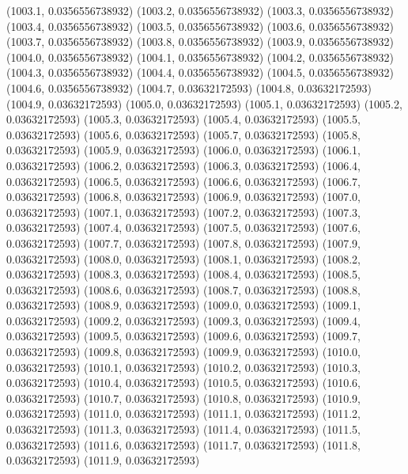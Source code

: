 {					(1003.1, 0.0356556738932)
					(1003.2, 0.0356556738932)
					(1003.3, 0.0356556738932)
					(1003.4, 0.0356556738932)
					(1003.5, 0.0356556738932)
					(1003.6, 0.0356556738932)
					(1003.7, 0.0356556738932)
					(1003.8, 0.0356556738932)
					(1003.9, 0.0356556738932)
					(1004.0, 0.0356556738932)
					(1004.1, 0.0356556738932)
					(1004.2, 0.0356556738932)
					(1004.3, 0.0356556738932)
					(1004.4, 0.0356556738932)
					(1004.5, 0.0356556738932)
					(1004.6, 0.0356556738932)
					(1004.7, 0.03632172593)
					(1004.8, 0.03632172593)
					(1004.9, 0.03632172593)
					(1005.0, 0.03632172593)
					(1005.1, 0.03632172593)
					(1005.2, 0.03632172593)
					(1005.3, 0.03632172593)
					(1005.4, 0.03632172593)
					(1005.5, 0.03632172593)
					(1005.6, 0.03632172593)
					(1005.7, 0.03632172593)
					(1005.8, 0.03632172593)
					(1005.9, 0.03632172593)
					(1006.0, 0.03632172593)
					(1006.1, 0.03632172593)
					(1006.2, 0.03632172593)
					(1006.3, 0.03632172593)
					(1006.4, 0.03632172593)
					(1006.5, 0.03632172593)
					(1006.6, 0.03632172593)
					(1006.7, 0.03632172593)
					(1006.8, 0.03632172593)
					(1006.9, 0.03632172593)
					(1007.0, 0.03632172593)
					(1007.1, 0.03632172593)
					(1007.2, 0.03632172593)
					(1007.3, 0.03632172593)
					(1007.4, 0.03632172593)
					(1007.5, 0.03632172593)
					(1007.6, 0.03632172593)
					(1007.7, 0.03632172593)
					(1007.8, 0.03632172593)
					(1007.9, 0.03632172593)
					(1008.0, 0.03632172593)
					(1008.1, 0.03632172593)
					(1008.2, 0.03632172593)
					(1008.3, 0.03632172593)
					(1008.4, 0.03632172593)
					(1008.5, 0.03632172593)
					(1008.6, 0.03632172593)
					(1008.7, 0.03632172593)
					(1008.8, 0.03632172593)
					(1008.9, 0.03632172593)
					(1009.0, 0.03632172593)
					(1009.1, 0.03632172593)
					(1009.2, 0.03632172593)
					(1009.3, 0.03632172593)
					(1009.4, 0.03632172593)
					(1009.5, 0.03632172593)
					(1009.6, 0.03632172593)
					(1009.7, 0.03632172593)
					(1009.8, 0.03632172593)
					(1009.9, 0.03632172593)
					(1010.0, 0.03632172593)
					(1010.1, 0.03632172593)
					(1010.2, 0.03632172593)
					(1010.3, 0.03632172593)
					(1010.4, 0.03632172593)
					(1010.5, 0.03632172593)
					(1010.6, 0.03632172593)
					(1010.7, 0.03632172593)
					(1010.8, 0.03632172593)
					(1010.9, 0.03632172593)
					(1011.0, 0.03632172593)
					(1011.1, 0.03632172593)
					(1011.2, 0.03632172593)
					(1011.3, 0.03632172593)
					(1011.4, 0.03632172593)
					(1011.5, 0.03632172593)
					(1011.6, 0.03632172593)
					(1011.7, 0.03632172593)
					(1011.8, 0.03632172593)
					(1011.9, 0.03632172593)
}

